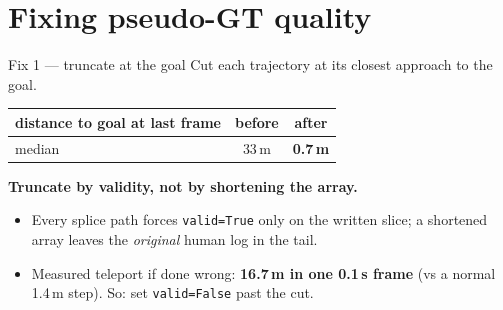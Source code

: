 \section{Fixing pseudo-GT quality}

\begin{frame}{Fix 1 --- truncate at the goal}
  Cut each trajectory at its closest approach to the goal.
  \begin{center}
    \begin{tabular}{@{}lcc@{}}
      \toprule
      distance to goal at last frame & before & after \\
      \midrule
      median & 33\,m & \textbf{0.7\,m} \\
      \bottomrule
    \end{tabular}
  \end{center}

  \vspace{0.5em}
  \textbf{Truncate by validity, not by shortening the array.}
  \begin{itemize}
    \item Every splice path forces \texttt{valid=True} only on the written slice;
          a shortened array leaves the \emph{original} human log in the tail.
    \item Measured teleport if done wrong: \textbf{16.7\,m in one 0.1\,s frame}
          (vs a normal 1.4\,m step). So: set \texttt{valid=False} past the cut.
  \end{itemize}
\end{frame}

